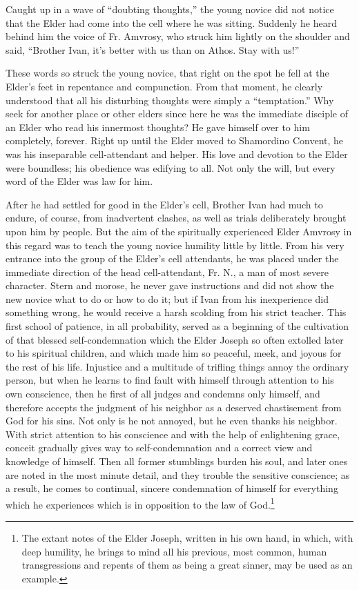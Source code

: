 Caught up in a wave of “doubting thoughts,” the young novice did not notice that the Elder had come into the cell where he was sitting. Suddenly he heard behind him the voice of Fr. Amvrosy, who struck him lightly on the shoulder and said, “Brother Ivan, it's better with us than on Athos. Stay with us!”

These words so struck the young novice, that right on the spot he fell at the Elder's feet in repentance and compunction. From that moment, he clearly understood that all his disturbing thoughts were simply a “temptation.” Why seek for another place or other elders since here he was the immediate disciple of an Elder who read his innermost thoughts? He gave himself over to him completely, forever. Right up until the Elder moved to Shamordino Convent, he was his inseparable cell-attendant and helper. His love and devotion to the Elder were boundless; his obedience was edifying to all. Not only the will, but every word of the Elder was law for him.

After he had settled for good in the Elder's cell, Brother Ivan had much to endure, of course, from inadvertent clashes, as well as trials deliberately brought upon him by people. But the aim of the spiritually experienced Elder Amvrosy in this regard was to teach the young novice humility little by little. From his very entrance into the group of the Elder's cell attendants, he was placed under the immediate direction of the head cell-attendant, Fr. N., a man of most severe character. Stern and morose, he never gave instructions and did not show the new novice what to do or how to do it; but if Ivan from his inexperience did something wrong, he would receive a harsh scolding from his strict teacher. This first school of patience, in all probability, served as a beginning of the cultivation of that blessed self-condemnation which the Elder Joseph so often extolled later to his spiritual children, and which made him so peaceful, meek, and joyous for the rest of his life. Injustice and a multitude of trifling things annoy the ordinary person, but when he learns to find fault with himself through attention to his own conscience, then he first of all judges and condemns only himself, and therefore accepts the judgment of his neighbor as a deserved chastisement from God for his sins. Not only is he not annoyed, but he even thanks his neighbor. With strict attention to his conscience and with the help of enlightening grace, conceit gradually gives way to self-condemnation and a correct view and knowledge of himself. Then all former stumblings burden his soul, and later ones are noted in the most minute detail, and they trouble the sensitive conscience; as a result, he comes to continual, sincere condemnation of himself for everything which he experiences which is in opposition to the law of God.\footnote{The extant notes of the Elder Joseph, written in his own hand, in which, with deep humility, he brings to mind all his previous, most common, human transgressions and repents of them as being a great sinner, may be used as an example.}

